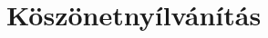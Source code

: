 \documentclass[tocnopagenum]{thesis-ekf}
\theoremstyle{definition}
\theoremstyle{remark}
\begin{document}

	\chapter*{Köszönetnyílvánítás}
	
	

	\listoffigures
\end{document}
